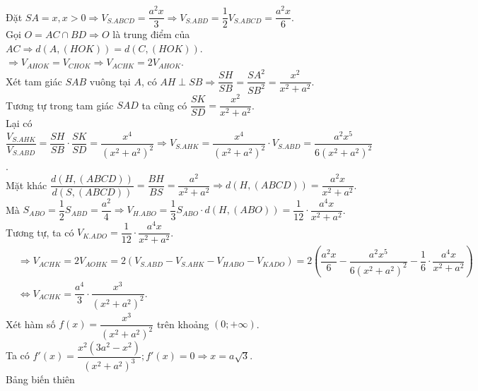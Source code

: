 \begin{ex}
{\begin{center}
		\end{center}
		Đặt $S A=x, x>0 \Rightarrow V_{S . A B C D}=\dfrac{a^2 x}{3}\Rightarrow V_{S . A B D}=\dfrac{1}{2}V_{S . A B C D}=\dfrac{a^2 x}{6}$.\\
		Gọi $O=A C \cap B D \Rightarrow O$ là trung điểm của $A C \Rightarrow d(A,(H O K))=d(C,(H O K))$.\\ 
		$\Rightarrow V_{AHOK}=V_{C H O K}\Rightarrow V_{A C H K}=2 V_{A H O K}$.\\
		Xét tam giác $S A B$ vuông tại $A$, có $A H \perp S B \Rightarrow \dfrac{S H}{S B}=\dfrac{S A^2}{S B^2}=\dfrac{x^2}{x^2+a^2}$.\\
		Tương tự trong tam giác $S A D$ ta cũng có $\dfrac{S K}{S D}=\dfrac{x^2}{x^2+a^2}$.\\
		Lại có $\dfrac{V_{S . A H K}}{V_{S . A B D}}=\dfrac{S H}{S B}\cdot \dfrac{S K}{S D}=\dfrac{x^4}{\left(x^2+a^2\right)^2}\Rightarrow V_{S . A H K}=\dfrac{x^4}{\left(x^2+a^2\right)^2}\cdot V_{S . A B D}=\dfrac{a^2 x^5}{6\left(x^2+a^2\right)^2}$.\\
		Mặt khác $\dfrac{d(H,(A B C D))}{d(S,(A B C D))}=\dfrac{B H}{B S}=\dfrac{a^2}{x^2+a^2}\Rightarrow d(H,(A B C D))=\dfrac{a^2 x}{x^2+a^2}$.\\
		Mà $S_{A B O}=\dfrac{1}{2}S_{A B D}=\dfrac{a^2}{4}\Rightarrow V_{H . A B O}=\dfrac{1}{3}S_{A B O}\cdot d(H,(A B O))=\dfrac{1}{12}\cdot \dfrac{a^4 x}{x^2+a^2}$.\\
		Tương tự, ta có $V_{K . A D O}=\dfrac{1}{12}\cdot \dfrac{a^4 x}{x^2+a^2}$.\\
		$\begin{aligned}
			& \Rightarrow V_{A C H K}=2 V_{A O H K}=2\left(V_{S . A B D}-V_{S . A H K}-V_{H A B O}-V_{K A D O}\right)=2\left(\dfrac{a^2 x}{6}-\dfrac{a^2 x^5}{6\left(x^2+a^2\right)^2}-\dfrac{1}{6}\cdot \dfrac{a^4 x}{x^2+a^2}\right) \\
			& \Leftrightarrow V_{A C H K}=\dfrac{a^4}{3}\cdot \dfrac{x^3}{\left(x^2+a^2\right)^2}.
		\end{aligned}$\\
		Xét hàm số $f(x)=\dfrac{x^3}{\left(x^2+a^2\right)^2}$ trên khoảng $(0 ;+\infty)$.\\
		Ta có $f'(x)=\dfrac{x^2\left(3 a^2-x^2\right)}{\left(x^2+a^2\right)^3}; f'(x)=0 \Rightarrow x=a \sqrt{3}$.\\
		Bảng biến thiên
		\begin{center}

\end{center}}
\end{ex}
